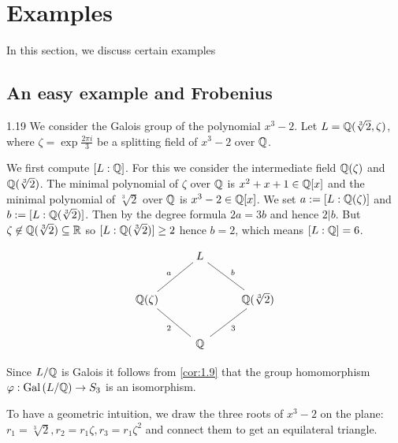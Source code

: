 \documentclass[twoside = false,	%
		headsepline,		%
		parskip = true,
		]{scrbook}						%
\begin{document}
\section{Examples}
    In this section, we discuss certain examples
    \subsection{An easy example and Frobenius}
    
        \begin{example}{}{1.19}
            We consider the Galois group of the polynomial $x^3-2$. Let $L = \mathbb Q(\sqrt[3]{2},\zeta)$, where $\zeta = \exp{\frac{2 \pi i}{3}}$ be a splitting field of $x^3 - 2$ over $\mathbb Q$.
            
            We first compute $[L:\mathbb Q]$. For this we consider the intermediate field $\mathbb Q(\zeta)$ and $\mathbb Q(\sqrt[3]{2})$. The minimal polynomial of $\zeta$ over $\mathbb Q$ is $x^2 + x + 1 \in \mathbb Q[x]$ and the minimal polynomial of $\sqrt[3]{2}$ over $\mathbb Q$ is $x^3 - 2 \in \mathbb Q[x]$. We set $a:= [L:\mathbb Q(\zeta)]$ and $b:=[L:\mathbb Q(\sqrt[3]{2})]$. Then by the degree formula $2a = 3b$ and hence $2 | b$. But $\zeta \not \in \mathbb Q(\sqrt[3]{2}) \subseteq \mathbb R$ so $[L:\mathbb Q(\sqrt[3]{2})] \geq 2$ hence $b = 2$, which means $[L:\mathbb Q] = 6$.
            
            \begin{equation*}
                \xymatrix@W=15pt
                {
                & L\ar@{-}_{a}[dl]\ar@{-}^{b}[dr] & \\
                \Q(\zeta)\ar@{-}_{2}[dr] & & \Q(\sqrt[3]{2})\ar@{-}^{3}[dl] \\
                & \Q &
                }
            \end{equation*}
        
            Since $L/\mathbb Q$ is Galois it follows from \ref{cor:1.9} that the group homomorphism $\varphi: \mathrm{Gal}\left( L/\mathbb Q\right) \rightarrow S_3$ is an isomorphism.
            
            To have a geometric intuition, we draw the three roots of $x^3 - 2$ on the plane: $r_1 = \sqrt[3]{2}, r_2 = r_1 \zeta, r_3 = r_1 \zeta^2$ and connect them to get an equilateral triangle.
            
            \begin{center}
\end{center}
\end{example}
\end{document}
